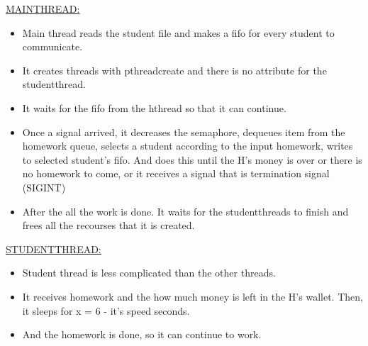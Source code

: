 \documentclass[12pt]{report}
\renewcommand{\_}{\kern-1.5pt\textunderscore\kern-1.5pt}
\begin{document}
\vspace{\baselineskip}
\vspace{\baselineskip}
\vspace{\baselineskip}
\vspace{\baselineskip}
\vspace{\baselineskip}
\vspace{\baselineskip}
\vspace{\baselineskip}
\vspace{\baselineskip}
\vspace{\baselineskip}
\vspace{\baselineskip}
\vspace{\baselineskip}
\begin{justify}
{\fontsize{14pt}{16.8pt}\selectfont \uline{MAIN\_THREAD:}}
\end{justify}
\begin{itemize}
	\item Main thread reads the student file and makes a fifo for every student to communicate.
	\item It creates threads with pthread\_create and there is no attribute for the student\_thread.
	\item It waits for the fifo from the h\_thread so that it can continue.
	\item Once a signal arrived, it decreases the semaphore, dequeues item from the homework queue, selects a student according to the input homework, writes to selected student’s fifo. And does this until the H’s money is over or there is no homework to come, or it receives a signal that is termination signal (SIGINT)
\end{itemize}
\begin{itemize}
	\item After the all the work is done. It waits for the student\_threads to finish and frees all the recourses that it is created.
\end{itemize}

\vspace{\baselineskip}
\begin{justify}
{\fontsize{14pt}{16.8pt}\selectfont \uline{STUDENT\_THREAD:}}
\end{justify}
\begin{itemize}
	\item Student thread is less complicated than the other threads.
	\item It receives homework and the how much money is left in the H’s wallet. Then, it sleeps for x = 6 - it’s speed seconds. 
	\item And the homework is done, so it can continue to work.
\end{itemize}
\end{document}
